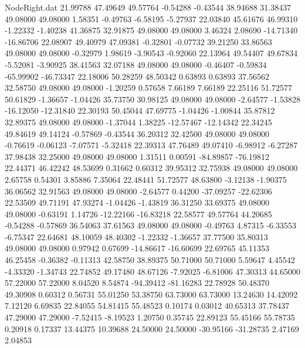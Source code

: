\begin{filecontents}{NodeRight.dat}
  21.99788   47.49649   49.57764    -0.54288   -0.43544   38.94688   31.38437   49.08000   49.08000    1.58351   -0.49763   -6.58195   -5.27937
  22.03840   45.61676   46.99310    -1.22332   -1.40238   41.36875   32.91875   49.08000   49.08000    3.46324    2.08690  -14.71340  -16.86706
  22.08907   49.40979   47.09381    -0.32801   -0.07732   39.21250   33.86563   49.08000   49.08000   -0.32979    1.98619   -3.90543   -0.92060
  22.13964   49.54407   49.67834    -5.52081   -3.90925   38.41563   32.07188   49.08000   49.08000   -0.46407   -0.59834  -65.99902  -46.73347
  22.18006   50.28259   48.50342     0.63893    0.63893   37.56562   32.58750   49.08000   49.08000   -1.20259    0.57658    7.66189    7.66189
  22.25116   51.72577   50.61829    -1.36657   -1.04426   35.73750   30.98125   49.08000   49.08000   -2.64577   -1.53828  -16.12050  -12.31840
  22.30193   50.45044   47.69775    -1.04426   -1.00844   35.87812   32.89375   49.08000   49.08000   -1.37044    1.38225  -12.57467  -12.14342
  22.34245   49.84619   49.14124    -0.57869   -0.43544   36.20312   32.42500   49.08000   49.08000   -0.76619   -0.06123   -7.07571   -5.32418
  22.39313   47.76489   49.07410    -6.98912   -6.27287   37.98438   32.25000   49.08000   49.08000    1.31511    0.00591  -84.89857  -76.19812
  22.44371   46.42242   48.53699     0.31662    0.60312   39.95312   32.75938   49.08000   49.08000    2.65758    0.54301    3.85886    7.35064
  22.48441   51.72577   48.63800    -3.12138   -1.90375   36.06562   32.91563   49.08000   49.08000   -2.64577    0.44200  -37.09257  -22.62306
  22.53509   49.71191   47.93274    -1.04426   -1.43819   36.31250   33.69375   49.08000   49.08000   -0.63191    1.14726  -12.22166  -16.83218
  22.58577   49.57764   44.20685    -0.54288   -0.57869   36.54063   37.61563   49.08000   49.08000   -0.49763    4.87315   -6.33553   -6.75347
  22.64681   48.10059   48.40302    -1.22332   -1.36657   37.77500   35.80313   49.08000   49.08000    0.97942    0.67699  -14.86617  -16.60699
  22.69765   45.11353   46.25458    -0.36382   -0.11313   42.58750   38.89375   50.71000   50.71000    5.59647    4.45542   -4.33320   -1.34743
  22.74852   49.17480   48.67126    -7.92025   -6.81006   47.30313   44.65000   57.22000   57.22000    8.04520    8.54874  -94.39412  -81.16283
  22.78928   50.48370   49.30908     0.60312    0.56731   55.01250   53.38750   63.73000   63.73000   13.24630   14.42092    7.12120    6.69835
  22.84055   54.81415   55.48523     0.10174    0.03012   40.65313   37.78437   47.29000   47.29000   -7.52415   -8.19523    1.20750    0.35745
  22.89123   55.45166   55.78735     0.20918    0.17337   13.44375   10.39688   24.50000   24.50000  -30.95166  -31.28735    2.47169    2.04853

\end{filecontents}
